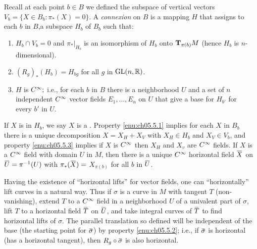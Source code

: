 \documentclass[../main]{subfiles}
\begin{document}
Recall at each point $b\in B$ we defined the subspace of vertical vectors \newline $V_{b}=\{X\in B_{b}: \pi_{\ast}(X)=0\}$. A \emph{connexion} on $B$ is a mapping $H$ that assigns to each $b$ in $B$,a subspace $H_{b}$ of $B_{b}$ such that:
\begin{enumerate}[label=(\arabic*)]
\item $H_{b} \cap V_{b}=0$ and $\pi_{\ast} \vert_{H_{b}}$ is an isomorphism of $H_{b}$ onto $\tangentspace{M}{\pi(b)}$ (hence $H_{b}$ is $n$-dimensional).\label{enu:ch05.5.1}

\item $(R_{g})_{\ast}(H_{b})=H_{bg}$ for all $g$ in $\GL(n, \bR)$.\label{enu:ch05.5.2}

\item $H$ is $\CInfty ;$ i.e., for each $b$ in $B$ there is a neighborhood $U$ and a set of $n$ independent $\CInfty$ vector fields $E_{1}, \ldots, E_{n}$ on $U$ that give a base for $H_{b'}$ for every $b'$ in $U .$\label{enu:ch05.5.3}
\end{enumerate}
If $X$ is in $H_{b}$, we say $X$ is a . Property \ref{enu:ch05.5.1} implies for each $X$ in $B_{b}$ there is a unique decomposition $X=X_{H}+X_{V}$ with $X_{H}\in H_{b}$ and $X_{V}\in V_{b}$, and property \ref{enu:ch05.5.3} implies if $X$ is $\CInfty$ then $X_{H}$ and $X_{v}$ are $\CInfty$ fields. If $X$ is a $\CInfty$ field with domain $U$ in $M$, then there is a unique $\CInfty$ horizontal field $\xoverline{X}$ on $\xoverline{U}=\pi^{-1}(U)$ with $\pi_{\ast}(\xoverline{X})=$ $X_{\pi(b)}$ for all $b$ in $\xoverline{U}$.

Having the existence of ``horizontal lifts'' for vector fields, one can ``horizontally'' lift curves in a natural way. Thus if $\sigma$ is a curve in $M$ with tangent $T$ (non-vanishing), extend $T$ to a $\CInfty$ field in a neighborhood $U$ of a univalent part of $\sigma$, lift $T$ to a horizontal field $\xoverline{T}$ on $\xoverline{U}$, and take integral curves of $\xoverline{T}$ to find horizontal lifts of $\sigma$. The parallel translation so defined will be independent of the base (the starting point for $\xoverline{\sigma}$) by property \ref{enu:ch05.5.2}; i.e., if $\xoverline{\sigma}$ is horizontal (has a horizontal tangent), then $R_g\circ\xoverline{\sigma}$ is also horizontal.
\end{document}
